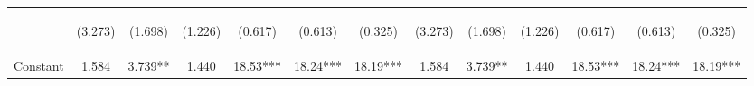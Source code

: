 \documentclass[]{article}
\begin{document}
\begin{center}
\begin{tabular}{lcccccccccccc}
\vspace{4pt} & \begin{footnotesize}(3.273)\end{footnotesize} & \begin{footnotesize}(1.698)\end{footnotesize} & \begin{footnotesize}(1.226)\end{footnotesize} & \begin{footnotesize}(0.617)\end{footnotesize} & \begin{footnotesize}(0.613)\end{footnotesize} & \begin{footnotesize}(0.325)\end{footnotesize} & \begin{footnotesize}(3.273)\end{footnotesize} & \begin{footnotesize}(1.698)\end{footnotesize} & \begin{footnotesize}(1.226)\end{footnotesize} & \begin{footnotesize}(0.617)\end{footnotesize} & \begin{footnotesize}(0.613)\end{footnotesize} & \begin{footnotesize}(0.325)\end{footnotesize} \\
Constant & 1.584 & 3.739** & 1.440 & 18.53*** & 18.24*** & 18.19*** & 1.584 & 3.739** & 1.440 & 18.53*** & 18.24*** & 18.19*** \\

\end{tabular}
\end{center}
\end{document}
